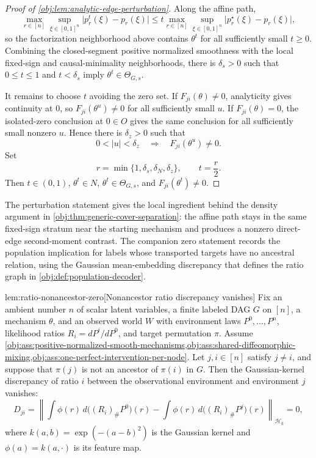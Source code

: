\documentclass[11pt]{article}
\begin{document}
\begin{proof}[Proof of \cref{obj:lem:analytic-edge-perturbation}]
Along the affine path,
\[
\max_{r\in[n]}\sup_{\xi\in[0,1]^n}
\bigl|p_r^t(\xi)-p_r(\xi)\bigr|
\le
 t\max_{r\in[n]}\sup_{\xi\in[0,1]^n}
\bigl|p_r^\star(\xi)-p_r(\xi)\bigr|,
\]
so the factorization neighborhood above contains \(\theta^t\) for all sufficiently small \(t\ge0\).  Combining the closed-segment positive normalized smoothness with the local fixed-sign and causal-minimality neighborhoods, there is \(\delta_s>0\) such that \(0\le t\le1\) and \(t<\delta_s\) imply \(\theta^t\in\Theta_{G,s}\). %

It remains to choose \(t\) avoiding the zero set.  If \(F_{ji}(\theta)\ne0\), analyticity gives continuity at \(0\), so \(F_{ji}(\theta^u)\ne0\) for all sufficiently small \(u\).  If \(F_{ji}(\theta)=0\), the isolated-zero conclusion at \(0\in O\) gives the same conclusion for all sufficiently small nonzero \(u\).  Hence there is \(\delta_z>0\) such that
\[
0<|u|<\delta_z
\quad\Longrightarrow\quad
F_{ji}(\theta^u)\ne0 .
\]
Set
\[
r=\min\{1,\delta_s,\delta_N,\delta_z\},\qquad t=\frac r2 .
\]
Then \(t\in(0,1)\), \(\theta^t\in N\), \(\theta^t\in\Theta_{G,s}\), and \(F_{ji}(\theta^t)\ne0\). %
\end{proof}

The perturbation statement gives the local ingredient behind the density argument in \cref{obj:thm:generic-cover-separation}: the affine path stays in the same fixed-sign stratum near the starting mechanism and produces a nonzero direct-edge second-moment contrast. The companion zero statement records the population implication for labels whose transported targets have no ancestral relation, using the Gaussian mean-embedding discrepancy that defines the ratio graph in \cref{obj:def:population-decoder}.

\begin{lemmav}{lem:ratio-nonancestor-zero}[Nonancestor ratio discrepancy vanishes]
Fix an ambient number \(n\) of scalar latent variables, a finite labeled DAG \(G\) on \([n]\), a mechanism \(\theta\), and an observed world \(W\) with environment laws \(P^0,\ldots,P^n\), likelihood ratios \(R_i=dP^i/dP^0\), and target permutation \(\pi\).  Assume \cref{obj:ass:positive-normalized-smooth-mechanisms,obj:ass:shared-diffeomorphic-mixing,obj:ass:one-perfect-intervention-per-node}.  Let \(j,i\in[n]\) satisfy \(j\ne i\), and suppose that \(\pi(j)\) is not an ancestor of \(\pi(i)\) in \(G\).  Then the Gaussian-kernel discrepancy of ratio \(i\) between the observational environment and environment \(j\) vanishes:
\[
D_{ji}
=
\left\|
\int \phi(r)\,d\bigl((R_i)_{\#}P^0\bigr)(r)
-
\int \phi(r)\,d\bigl((R_i)_{\#}P^j\bigr)(r)
\right\|_{\mathcal H_k}
=0,
\]
where \(k(a,b)=\exp(-(a-b)^2)\) is the Gaussian kernel and \(\phi(a)=k(a,\cdot)\) is its feature map.
\end{lemmav}
\end{document}
